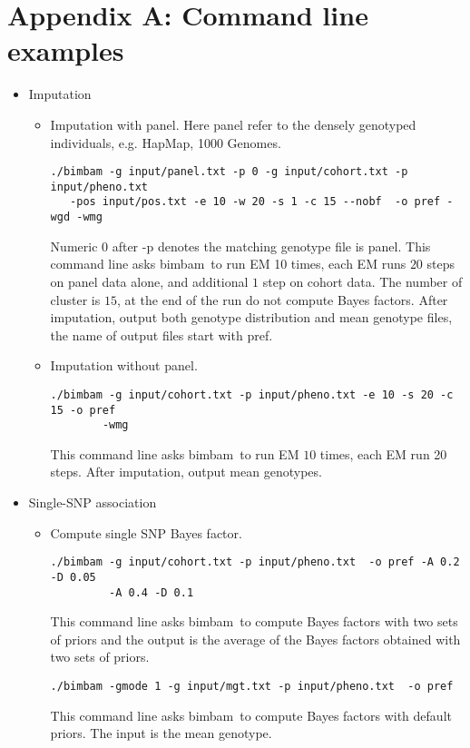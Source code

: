 \documentclass[11pt,Palatino]{article}
\def\bimbam{{\sc bimbam}~}
\begin{document}
\newpage
\section*{Appendix A: Command line examples}
\begin{itemize}
\item {\sc Imputation}
\begin{itemize}
\item Imputation with panel. Here panel refer to the densely genotyped individuals, e.g. HapMap, 1000 Genomes.
\begin{verbatim}
./bimbam -g input/panel.txt -p 0 -g input/cohort.txt -p input/pheno.txt 
   -pos input/pos.txt -e 10 -w 20 -s 1 -c 15 --nobf  -o pref -wgd -wmg
\end{verbatim}
Numeric $0$ after -p denotes the matching genotype file is panel. This command  line asks \bimbam to run EM 10 times, each EM runs $20$ steps on panel data alone, and additional $1$ step on cohort data. The number of cluster is $15$, at the end of the run do not compute Bayes factors. After imputation, output both genotype distribution and mean genotype files, the name of output files start with pref.   
\item Imputation without panel.  
\begin{verbatim}
./bimbam -g input/cohort.txt -p input/pheno.txt -e 10 -s 20 -c 15 -o pref 
        -wmg
\end{verbatim}
This command line asks \bimbam to run EM $10$ times, each EM run 20 steps. After imputation, output mean genotypes.
\end{itemize}

\item {\sc Single-SNP association}
\begin{itemize}
\item Compute single SNP Bayes factor.
\begin{verbatim}
./bimbam -g input/cohort.txt -p input/pheno.txt  -o pref -A 0.2 -D 0.05 
         -A 0.4 -D 0.1
\end{verbatim}
This command line asks \bimbam to compute Bayes factors with two sets of priors and the output is the average of the Bayes factors obtained with two sets of priors.

\begin{verbatim}
./bimbam -gmode 1 -g input/mgt.txt -p input/pheno.txt  -o pref  
\end{verbatim}
This command line asks \bimbam to compute Bayes factors with default priors.  The input is the mean genotype.


\end{itemize}
\end{itemize}
\end{document}
